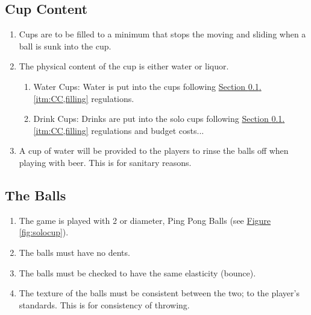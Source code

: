 	\subsection{Cup Content}\label{ssec:CupContent}
        \begin{enumerate}[label=(\roman*), ref=\roman*]
            \item \label{itm:CC,filling} Cups are to be filled to a minimum that stops the moving and sliding when a ball is sunk into the cup. 
            \item \label{itm:CC,w_vs_l} The physical content of the cup is either water or liquor.
                \begin{enumerate}[label=(\alph*), leftmargin=2cm]
                    \item Water Cups: Water is put into the cups following \hyperref[itm:CC,filling]{Section \ref*{ssec:CupContent}.\ref*{itm:CC,filling}} regulations.
                    \item Drink Cups: Drinks are put into the solo cups following \hyperref[itm:CC,filling]{Section \ref*{ssec:CupContent}.\ref*{itm:CC,filling}} regulations and budget costs...
                \end{enumerate} 
            \item \label{itm:CC,rinse} A cup of water will be provided to the players to rinse the balls off when playing with beer. This is for sanitary reasons. 
        \end{enumerate}        
    \subsection{The Balls}\label{ssec:Balls}
        \begin{enumerate}[label=(\roman*), ref=\roman*]
            \item \label{itm:Balls,num} The game is played with 2  or  diameter, Ping Pong Balls (see \hyperref[fig:solocup]{Figure \ref*{fig:solocup}}).
            \item \label{itm:Balls,dents} The balls must have no dents. 
            \item \label{itm:Balls,bounce} The balls must be checked to have the same elasticity (bounce). 
            \item \label{itm:Balls,texture} The texture of the balls must be consistent between the two; to the player's standards. This is for consistency of throwing. 
        \end{enumerate}    
